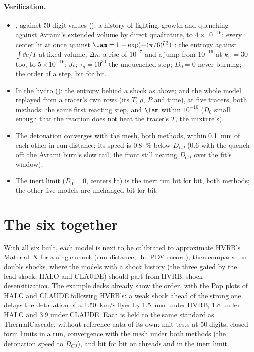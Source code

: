 \paragraph{Verification.}
\begin{itemize}
\item {}, against 50-digit values ():
  a history of lighting, growth and quenching against Avrami's extended
  volume by direct quadrature, to $4\times10^{-16}$; every center lit at
  once against $\lam = 1 - \exp(-(\pi/6)\hat t^{\,3})$ \cite{hill2009}; the
  entropy against $\int\dd e/T$ at fixed volume; $\Delta n$, a rise of
  $10^{-7}$ and a jump from $10^{-16}$ at $k_w = 30$ too, to $5\times10^{-16}$;
  $J_k$; $\tau_q = 10^{30}$ the unquenched step;
  $D_0 = 0$ never burning; the order of a step, bit for bit.
\item In the hydro (): the entropy
  behind a shock as above; and the whole model replayed from a tracer's own
  rows (its $T$, $\rho$, $P$ and time), at five tracers, both methods: the
  same first reacting step, and $\lam$ within $10^{-10}$ ($D_0$ small enough
  that the reaction does not heat the tracer's $T$, the mixture's).
\item The detonation converges with the mesh, both methods, within 0.1~mm
  of each other in run distance; its speed is 0.8~\% below $D_{CJ}$ (0.6
  with the quench off: the Avrami burn's slow tail, the front still
  nearing $D_{CJ}$ over the fit's window).
\item The inert limit ($D_0 = 0$, centers lit) is the inert run bit for bit,
  both methods; the other five models are unchanged bit for bit.
\end{itemize}

\section{The six together}
\label{sec:six-together}

With all six built, each model is next to be calibrated to approximate
HVRB's Material~X for a single shock (run distance, the PDV record), then
compared on double shocks, where the models with a shock history (the three
gated by the lead shock, HALO and CLAUDE) should part from HVRB: shock
desensitization. The example decks already show the order, with the Pop
plots of HALO and CLAUDE following HVRB's: a weak shock ahead of the strong
one delays the detonation of a 1.50~km/s flyer by 1.5~mm under HVRB, 1.8
under HALO and 3.9 under CLAUDE. Each
is held to the same standard as ThermalCascade, without reference data of
its own: unit tests at 50 digits, closed-form limits in a run, convergence
with the mesh under both methods (the detonation speed to $D_{CJ}$), and bit
for bit on threads and in the inert limit.
